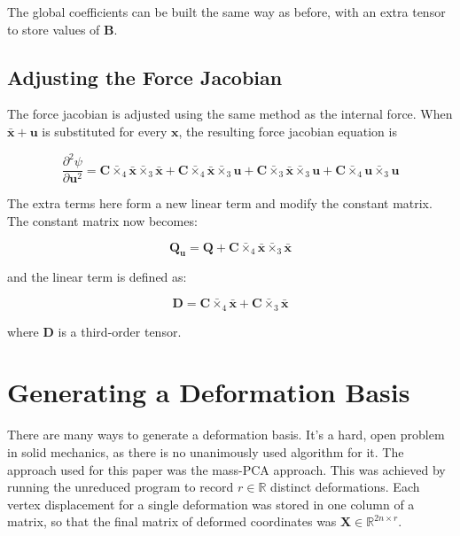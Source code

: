 \documentclass[twocolumn,10pt]{asme2ej}
\begin{document}
The global coefficients can be built the same way as before, with an extra tensor to store values of $\bm{B}$.

\subsection{Adjusting the Force Jacobian}

The force jacobian is adjusted using the same method as the internal force. When $\bm{\bar{x}} + \bm{u}$ is substituted for every $\bm{x}$, the resulting force jacobian equation is

\begin{equation}
 \frac{\partial^2 \psi}{\partial \bm{u}^2} = \bm{C} \bar{\times}_4 \bm{\bar{x}} \bar{\times}_3 \bm{\bar{x}}
 + \bm{C} \bar{\times}_4 \bm{\bar{x}} \bar{\times}_3 \bm{u} + \bm{C} \bar{\times}_3 \bm{\bar{x}} \bar{\times}_3 \bm{u}
 + \bm{C} \bar{\times}_4 \bm{u} \bar{\times}_3 \bm{u}
\end{equation}

The extra terms here form a new linear term and modify the constant matrix. The constant matrix now becomes:

\begin{equation}
 \bm{Q_u} = \bm{Q} + \bm{C} \bar{\times}_4 \bm{\bar{x}} \bar{\times}_3 \bm{\bar{x}}
\end{equation}

and the linear term is defined as:

\begin{equation}
 \bm{D} = \bm{C} \bar{\times}_4 \bm{\bar{x}} + \bm{C} \bar{\times}_3 \bm{\bar{x}}
\end{equation}

where $\bm{D}$ is a third-order tensor. 
\section{Generating a Deformation Basis}

There are many ways to generate a deformation basis. It's a hard, open problem in solid mechanics, as there is no unanimously used algorithm for it. The approach used for this paper was the mass-PCA approach. This was achieved by running the unreduced program to record $r \in \mathbb{R}$ distinct deformations. Each vertex displacement for a single deformation was stored in one column of a matrix, so that the final matrix of deformed coordinates was $\bm{X} \in \mathbb{R}^{2n \times r}$.
\end{document}
